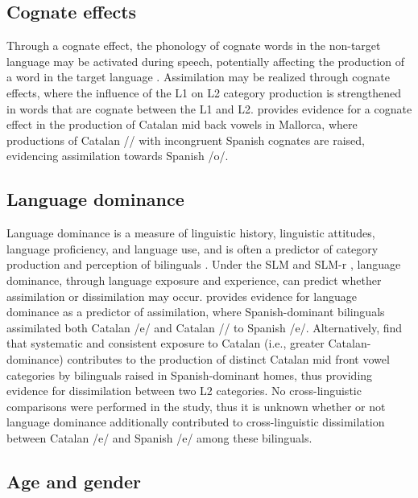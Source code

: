 \documentclass[output=paper,colorlinks,citecolor=brown,draftmode]{langscibook}
\begin{document}
\subsection{Cognate effects}

Through a cognate effect, the phonology of cognate words in the non-target language may be activated during speech, potentially affecting the production of a word in the target language \citep{costa2000cognate,colome2010words}. Assimilation may be realized through cognate effects, where the influence of the L1 on L2 category production is strengthened in words that are cognate between the L1 and L2. \citet{amengual2016cross} provides evidence for a cognate effect in the production of Catalan mid back vowels in Mallorca, where productions of Catalan /\textopeno/ with incongruent Spanish cognates are raised, evidencing assimilation towards Spanish /o/.

\subsection{Language dominance}

Language dominance is a measure of linguistic history, linguistic attitudes, language proficiency, and language use, and is often a predictor of category production and perception of bilinguals \citep{birdsong2012bilingual}. Under the SLM and SLM-r \citep{flege1995second,flege2021revised}, language dominance, through language exposure and experience, can predict whether assimilation or dissimilation may occur. \citet{amengual2016perception} provides evidence for language dominance as a predictor of assimilation, where Spanish-dominant bilinguals assimilated both Catalan /e/ and Catalan /\textepsilon/ to Spanish /e/. Alternatively, \citet{bosch2011variability} find that systematic and consistent exposure to Catalan (i.e., greater Catalan-dominance) contributes to the production of distinct Catalan mid front vowel categories by bilinguals raised in Spanish-dominant homes, thus providing evidence for dissimilation between two L2 categories. No cross-linguistic comparisons were performed in the study, thus it is unknown whether or not language dominance additionally contributed to cross-linguistic dissimilation between Catalan /e/ and Spanish /e/ among these bilinguals.

\subsection{Age and gender}
\end{document}
